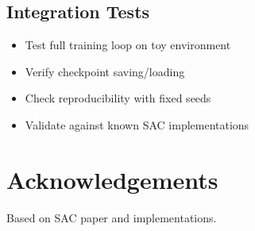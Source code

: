 \documentclass[11pt,a4paper]{article}
\begin{document}
\subsection{Integration Tests}
\begin{itemize}
  \item Test full training loop on toy environment
  \item Verify checkpoint saving/loading
  \item Check reproducibility with fixed seeds
  \item Validate against known SAC implementations
\end{itemize}

\section{Acknowledgements}
Based on SAC paper and implementations.



\end{document}
